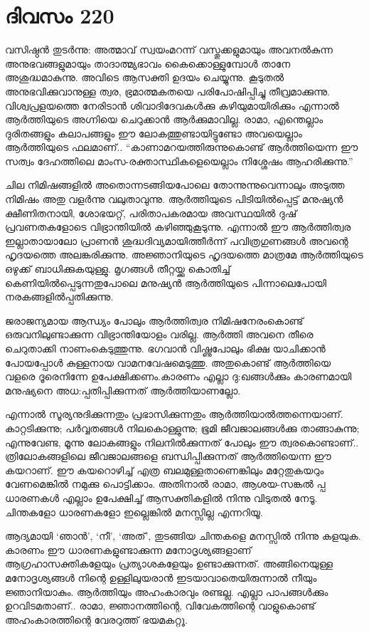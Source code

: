 \section{ദിവസം 220}



വസിഷ്ഠൻ തുടർന്നു: അത്മാവ് സ്വയംമറന്ന് വസ്തുക്കളുമായും അവനൽകുന്ന അനുഭവങ്ങളുമായും താദാത്മ്യഭാവം കൈക്കൊള്ളുമ്പോൾ താനേ അശുദ്ധമാകുന്നു. അവിടെ ആസക്തി ഉദയം ചെയ്യുന്നു. കൂടുതൽ അനുഭവിക്കുവാനുള്ള ത്വര, ഭ്രമാത്മകതയെ പരിപോഷിപ്പിച്ചു തീവ്രമാക്കുന്നു. വിശ്വപ്രളയത്തെ നേരിടാൻ ശിവാദിദേവകൾക്കു കഴിയുമായിരിക്കും എന്നാൽ ആർത്തിയുടെ അഗ്നിയെ ചെറുക്കാൻ ആർക്കുമാവില്ല. രാമാ, എന്തെല്ലാം ദുരിതങ്ങളും കലാപങ്ങളും ഈ ലോകത്തുണ്ടായിട്ടുണ്ടോ അവയെല്ലാം ആർത്തിയുടെ ഫലമാണ്‌.. “കാണാമറയത്തിരുന്നുകൊണ്ട് ആർത്തിയെന്ന ഈ സത്വം ദേഹത്തിലെ മാംസ-രക്താസ്ഥികളെയെല്ലാം നിശ്ശേഷം ആഹരിക്കുന്നു.” 

ചില നിമിഷങ്ങളിൽ അതൊന്നടങ്ങിയപോലെ തോന്നുന്നുവെന്നാലും അടുത്ത നിമിഷം അതു വളർന്നു വലുതാവുന്നു. ആർത്തിയുടെ പിടിയിൽപ്പെട്ട് മനുഷ്യൻ ക്ഷീണിതനായി, ശോഭയറ്റ്, പരിതാപകരമായ അവസ്ഥയിൽ ദുഷ് പ്രവണതകളോടെ വിഭ്രാന്തിയിൽ കഴിഞ്ഞുകൂടുന്നു. എന്നാൽ ഈ ആർത്തിത്വര ഇല്ലാതായാലോ പ്രാണൻ ശുദ്ധദിവ്യമായിത്തീർന്ന് പവിത്രഗുണങ്ങൾ അവന്റെ ഹൃദയത്തെ അലങ്കരിക്കുന്നു. അജ്ഞാനിയുടെ ഹൃദയത്തെ മാത്രമേ ആർത്തിയുടെ ഒഴുക്ക് ബാധിക്കുകയുള്ളു. മൃഗങ്ങൾ തീറ്റയ്ക്കു കൊതിച്ച് കെണിയിൽപ്പെടുന്നതുപോലെ മനുഷ്യൻ ആർത്തിയുടെ പിന്നാലെപോയി നരകങ്ങളില്‍പ്പതിക്കുന്നു. 

ജരാജന്യമായ ആന്ധ്യം പോലും ആർത്തിത്വര നിമിഷനേരംകൊണ്ട് ഒരുവനിലുണ്ടാക്കുന്ന വിഭ്രാന്തിയോളം വരില്ല. ആർത്തി അവനെ തീരെ ചെറുതാക്കി നാണംകെടുത്തുന്നു. ഭഗവാൻ വിഷ്ണുപോലും ഭിക്ഷ യാചിക്കാൻ പോയപ്പോൾ കുള്ളനായ വാമനവേഷമെടുത്തു. അതുകൊണ്ട് ആർത്തിയെ വളരെ ദൂരെനിന്നേ ഉപേക്ഷിക്കണം.കാരണം എല്ലാ ദു:ഖങ്ങൾക്കും കാരണമായി മനുഷ്യനെ അധ:പ്പതിപ്പിക്കുന്നത് ആർത്തിയാണല്ലോ. 

എന്നാൽ സൂര്യനുദിക്കുന്നതും പ്രഭാസിക്കുന്നതും ആര്‍ത്തിയാല്‍ത്തന്നെയാണ്. കാറ്റടിക്കുന്നു; പർവ്വതങ്ങൾ നിലകൊള്ളുന്നു; ഭൂമി ജീവജാലങ്ങൾക്കു താങ്ങാകുന്നു; എന്നുവേണ്ട, മൂന്നു ലോകങ്ങളും നിലനില്‍ക്കുന്നത് പോലും ഈ ത്വരകൊണ്ടാണ്‌.. ത്രിലോകങ്ങളിലെ ജീവജാലങ്ങളെ ബന്ധിപ്പിക്കുന്നത് ആർത്തിയെന്ന ഈ കയറാണ്‌. ഈ കയറൊഴിച്ച് എത്ര ബലമുള്ളതാണെങ്കിലും  മറ്റേതുകയറും വേണമെങ്കിൽ നമുക്കു പൊട്ടിക്കാം. അതിനാൽ രാമാ, ആശയ-സങ്കൽ പ്പ ധാരണകൾ എല്ലാം ഉപേക്ഷിച്ച് ആസക്തികളിൽ നിന്നു വിടുതൽ നേടൂ. ചിന്തകളോ ധാരണകളോ ഇല്ലെങ്കിൽ മനസ്സില്ല എന്നറിയൂ. 

ആദ്യമായി ‘ഞാൻ’, ‘നീ’, ‘അത്’, തുടങ്ങിയ ചിന്തകളെ മനസ്സിൽ നിന്നു കളയുക. കാരണം ഈ ധാരണകളുണ്ടാക്കുന്ന മനോദൃശ്യങ്ങളാണ്‌ ആഗ്രഹാസക്തികളേയും പ്രത്യാശകളേയും ഉണ്ടാക്കുന്നത്. അങ്ങിനെയുള്ള മനോദൃശ്യങ്ങൾ നിന്റെ ഉള്ളിലുയരാൻ ഇടയാവാതെയിരുന്നാൽ നീയും ജ്ഞാനിയാകും. ആർത്തിയും അഹംകാരവും രണ്ടല്ല. എല്ലാ പാപങ്ങൾക്കും ഉറവിടമതാണ്‌.. രാമാ, ജ്ഞാനത്തിന്റെ, വിവേകത്തിന്റെ വാളുകൊണ്ട് അഹംകാരത്തിന്റെ വേരറുത്ത് ഭയമകറ്റൂ. 

